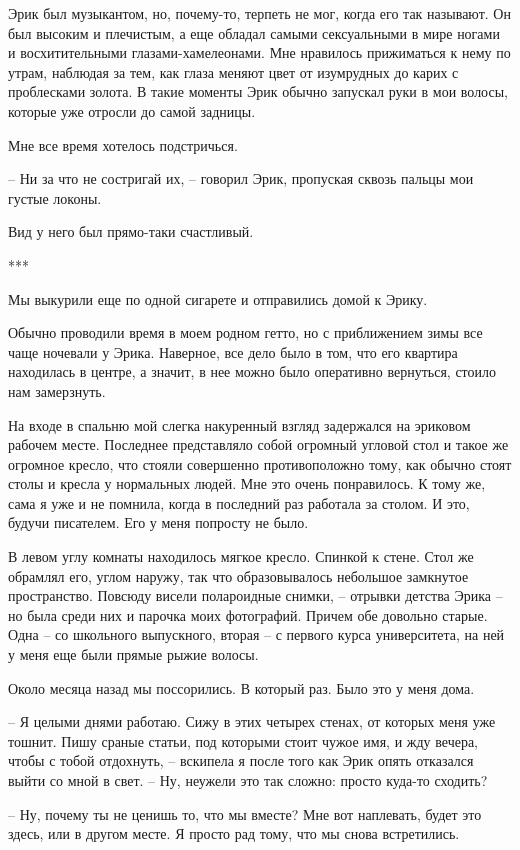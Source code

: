 \documentclass[
]{book}
\begin{document}
Эрик был музыкантом, но, почему-то, терпеть не мог, когда его так называют. Он был высоким и плечистым, а еще обладал самыми сексуальными в мире ногами и восхитительными глазами-хамелеонами. Мне нравилось прижиматься к нему по утрам, наблюдая за тем, как глаза меняют цвет от изумрудных до карих с проблесками золота. В такие моменты Эрик обычно запускал руки в мои волосы, которые уже отросли до самой задницы.

Мне все время хотелось подстричься.

-- Ни за что не состригай их, -- говорил Эрик, пропуская сквозь пальцы мои густые локоны.

Вид у него был прямо-таки счастливый.

***

Мы выкурили еще по одной сигарете и отправились домой к Эрику.

Обычно проводили время в моем родном гетто, но с приближением зимы все чаще ночевали у Эрика. Наверное, все дело было в том, что его квартира находилась в центре, а значит, в нее можно было оперативно вернуться, стоило нам замерзнуть.

На входе в спальню мой слегка накуренный взгляд задержался на эриковом рабочем месте. Последнее представляло собой огромный угловой стол и такое же огромное кресло, что стояли совершенно противоположно тому, как обычно стоят столы и кресла у нормальных людей. Мне это очень понравилось. К тому же, сама я уже и не помнила, когда в последний раз работала за столом. И это, будучи писателем. Его у меня попросту не было.

В левом углу комнаты находилось мягкое кресло. Спинкой к стене. Стол же обрамлял его, углом наружу, так что образовывалось небольшое замкнутое пространство. Повсюду висели полароидные снимки, -- отрывки детства Эрика -- но была среди них и парочка моих фотографий. Причем обе довольно старые. Одна -- со школьного выпускного, вторая -- с первого курса университета, на ней у меня еще были прямые рыжие волосы.

Около месяца назад мы поссорились. В который раз. Было это у меня дома.

-- Я целыми днями работаю. Сижу в этих четырех стенах, от которых меня уже тошнит. Пишу сраные статьи, под которыми стоит чужое имя, и жду вечера, чтобы с тобой отдохнуть, -- вскипела я после того как Эрик опять отказался выйти со мной в свет. -- Ну, неужели это так сложно: просто куда-то сходить?

-- Ну, почему ты не ценишь то, что мы вместе? Мне вот наплевать, будет это здесь, или в другом месте. Я просто рад тому, что мы снова встретились.
\end{document}
